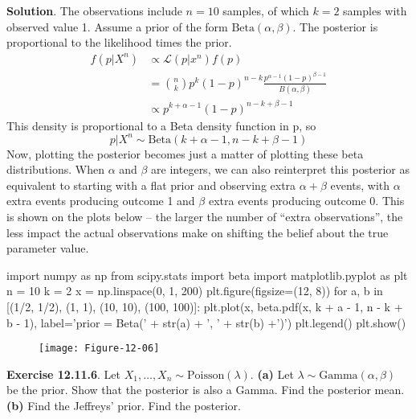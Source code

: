 \textbf{Solution}.
The observations include \(n = 10\) samples, of which \(k = 2\) samples
with observed value 1. Assume a prior of the form
\(\text{Beta}(\alpha, \beta)\).
The posterior is proportional to the likelihood times the prior.
\begin{align*}
f(p | X^{n}) & \propto \mathcal{L}(p | x^{n}) f(p) \\
&= \binom{n}{k} p^{k} (1 - p)^{n-k} \frac{p^{\alpha - 1}(1-p)^{\beta - 1}}{B(\alpha, \beta)}\\
&\propto p^{k + \alpha - 1} (1 - p)^{n - k + \beta - 1}
\end{align*}
This density is proportional to a Beta density function in p, so
\[
p | X^{n} \sim \text{Beta}(k + \alpha - 1, n - k + \beta - 1)
\]
Now, plotting the posterior becomes just a matter of plotting these beta
distributions.
When \(\alpha\) and \(\beta\) are integers, we can also reinterpret this
posterior as equivalent to starting with a flat prior and observing
extra \(\alpha + \beta\) events, with \(\alpha\) extra events producing
outcome 1 and \(\beta\) extra events producing outcome 0. This is shown
on the plots below -- the larger the number of ``extra observations'',
the less impact the actual observations make on shifting the belief
about the true parameter value.

\begin{python}
import numpy as np
from scipy.stats import beta
import matplotlib.pyplot as plt
n = 10
k = 2
x = np.linspace(0, 1, 200)
plt.figure(figsize=(12, 8))
for a, b in [(1/2, 1/2), (1, 1), (10, 10), (100, 100)]:
    plt.plot(x, beta.pdf(x, k + a - 1, n - k + b - 1), 
             label='prior = Beta(' + str(a) + ', ' + str(b) +')')
    plt.legend()
plt.show()
\end{python}

\begin{figure}[H]
\centering
\texttt{[image: Figure-12-06]}
\end{figure}

    

\textbf{Exercise 12.11.6}. Let
\(X_{1}, \dots, X_{n} \sim \text{Poisson}(\lambda)\).
\textbf{(a)} Let \(\lambda \sim \text{Gamma}(\alpha, \beta)\) be the
prior. Show that the posterior is also a Gamma. Find the posterior mean.
\textbf{(b)} Find the Jeffreys' prior. Find the posterior.

